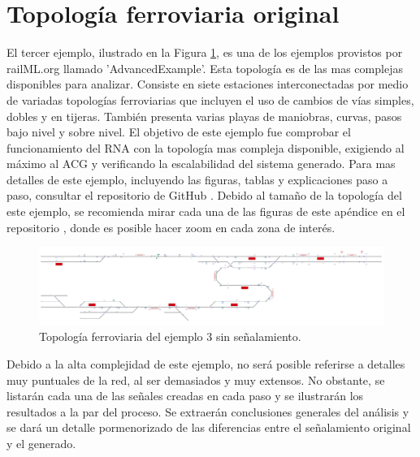 \section{Topología ferroviaria original}

	El tercer ejemplo, ilustrado en la Figura \ref{fig:EJ3_1}, es una de los ejemplos provistos por railML.org llamado 'AdvancedExample'. Esta topología es de las mas complejas disponibles para analizar. Consiste en siete estaciones interconectadas por medio de variadas topologías ferroviarias que incluyen el uso de cambios de vías simples, dobles y en tijeras. También presenta varias playas de maniobras, curvas, pasos bajo nivel y sobre nivel. El objetivo de este ejemplo fue comprobar el funcionamiento del RNA con la topología mas compleja disponible, exigiendo al máximo al ACG y verificando la escalabilidad del sistema generado. Para mas detalles de este ejemplo, incluyendo las figuras, tablas y explicaciones paso a paso, consultar el repositorio de GitHub \cite{GITHUB_PHD}. Debido al tamaño de la topología del este ejemplo, se recomienda mirar cada una de las figuras de este apéndice en el repositorio \cite{GITHUB_PHD}, donde es posible hacer zoom en cada zona de interés.
	
	\begin{figure}[H]
		\centering
		\includegraphics[width=1\textwidth]{resultados-obtenidos/ejemplo3/images/3_empty.png}
		\centering\caption{Topología ferroviaria del ejemplo 3 sin señalamiento.}
		\label{fig:EJ3_1}
	\end{figure}
	
	Debido a la alta complejidad de este ejemplo, no será posible referirse a detalles muy puntuales de la red, al ser demasiados y muy extensos. No obstante, se listarán cada una de las señales creadas en cada paso y se ilustrarán los resultados a la par del proceso. Se extraerán conclusiones generales del análisis y se dará un detalle pormenorizado de las diferencias entre el señalamiento original y el generado.
